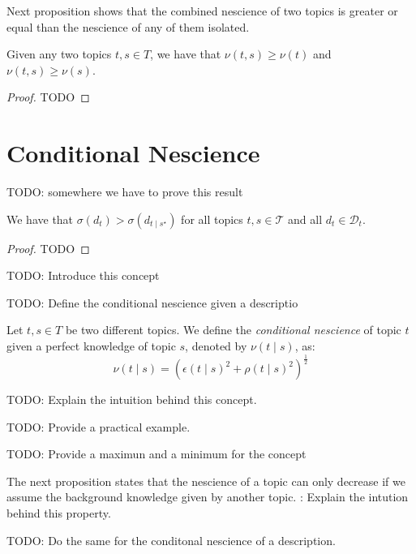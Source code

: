 Next proposition shows that the combined nescience of two topics is greater or equal than the nescience of any of them isolated.

\begin{proposition}
Given any two topics $t,s \in T$, we have that $\nu(t,s) \geq \nu(t)$ and $\nu(t,s) \geq \nu(s)$.
\end{proposition}
\begin{proof}
{\color{red}TODO}
\end{proof}

%
%

\section{Conditional Nescience}

{\color{red} TODO: somewhere we have to prove this result}

\begin{proposition}
We have that $\sigma(d_t) > \sigma(d_{t \mid s^\star})$ for all topics $t,s \in \mathcal{T}$ and all $d_t \in \mathcal{D}_t$.
\end{proposition}
\begin{proof}
{\color{red} TODO}
\end{proof}

{\color{red} TODO: Introduce this concept}

{\color{red} TODO: Define the conditional nescience given a descriptio}

\begin{definition} Let $t,s\in T$ be two different topics. We define the \emph{conditional nescience} of topic $t$ given a perfect knowledge of topic $s$, denoted by $\nu( t \mid s)$, as: 
\[
\nu(t \mid s) = \left( \epsilon\left( t \mid s \right)^2 + \rho\left( t \mid s \right)^2 \right) ^ \frac{1}{2}
\]
\end{definition}

{\color{red} TODO: Explain the intuition behind this concept.}

{\color{red} TODO: Provide a practical example.}

{\color{red} TODO: Provide a maximun and a minimum for the concept}

The next proposition states that the nescience of a topic can only decrease if we assume the background knowledge given by another topic. {\color{red}: Explain the intution behind this property.}

{\color{red} TODO: Do the same for the conditonal nescience of a description.}

